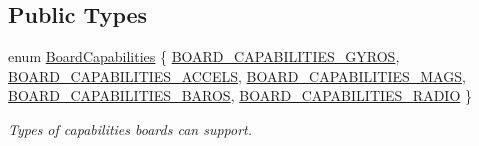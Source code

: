 \subsection*{\-Public \-Types}
\begin{DoxyCompactItemize}
\item 
enum \hyperlink{group___core_plugin_ga01b09218f2a13aaeee6db007ac6bd967}{\-Board\-Capabilities} \{ \*
\hyperlink{group___core_plugin_gga01b09218f2a13aaeee6db007ac6bd967a6490aec954e127f73371f4fb9b457b7c}{\-B\-O\-A\-R\-D\-\_\-\-C\-A\-P\-A\-B\-I\-L\-I\-T\-I\-E\-S\-\_\-\-G\-Y\-R\-O\-S}, 
\hyperlink{group___core_plugin_gga01b09218f2a13aaeee6db007ac6bd967ac0d0ee8be489c9d3b7b41f1463fea3f3}{\-B\-O\-A\-R\-D\-\_\-\-C\-A\-P\-A\-B\-I\-L\-I\-T\-I\-E\-S\-\_\-\-A\-C\-C\-E\-L\-S}, 
\hyperlink{group___core_plugin_gga01b09218f2a13aaeee6db007ac6bd967a769644e0a335cd070adf4c24017a462f}{\-B\-O\-A\-R\-D\-\_\-\-C\-A\-P\-A\-B\-I\-L\-I\-T\-I\-E\-S\-\_\-\-M\-A\-G\-S}, 
\hyperlink{group___core_plugin_gga01b09218f2a13aaeee6db007ac6bd967a9f6c413adaed7f2079e0d2f8097a6d68}{\-B\-O\-A\-R\-D\-\_\-\-C\-A\-P\-A\-B\-I\-L\-I\-T\-I\-E\-S\-\_\-\-B\-A\-R\-O\-S}, 
\*
\hyperlink{group___core_plugin_gga01b09218f2a13aaeee6db007ac6bd967a288728a55ec6a807d327586c5d061678}{\-B\-O\-A\-R\-D\-\_\-\-C\-A\-P\-A\-B\-I\-L\-I\-T\-I\-E\-S\-\_\-\-R\-A\-D\-I\-O}
 \}
\begin{DoxyCompactList}\small\item\em \-Types of capabilities boards can support. \end{DoxyCompactList}\end{DoxyCompactItemize}
